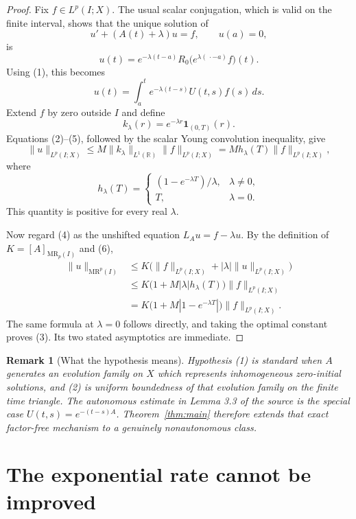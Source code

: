 \documentclass[11pt]{article}
\newtheorem{remark}[theorem]{Remark}
\newcommand{\R}{\mathbb R}
\newcommand{\Lp}{L^p}
\newcommand{\MR}{\mathrm{MR}^p}
\begin{document}
\begin{proof}
Fix $f\in\Lp(I;X)$.  The usual scalar conjugation, which is valid on the
finite interval, shows that the unique solution of
\[
 u'+(A(t)+\lambda)u=f,\qquad u(a)=0,
 \tag{4}
\]
is
\[
 u(t)=e^{-\lambda(t-a)}
 R_0\bigl(e^{\lambda(\,\cdot-a)}f\bigr)(t).
\]
Using (1), this becomes
\[
 u(t)=\int_a^t e^{-\lambda(t-s)}U(t,s)f(s)\,ds.
 \tag{5}
\]
Extend $f$ by zero outside $I$ and define
\[
 k_\lambda(r)=e^{-\lambda r}\mathbf 1_{(0,T)}(r).
\]
Equations (2)--(5), followed by the scalar Young convolution inequality,
give
\[
 \|u\|_{\Lp(I;X)}
 \le M\|k_\lambda\|_{L^1(\R)}\|f\|_{\Lp(I;X)}
 =M h_\lambda(T)\|f\|_{\Lp(I;X)},
 \tag{6}
\]
where
\[
 h_\lambda(T)=
 \begin{cases}
 (1-e^{-\lambda T})/\lambda,&\lambda\ne0,\\
 T,&\lambda=0.
 \end{cases}
\]
This quantity is positive for every real $\lambda$.

Now regard (4) as the unshifted equation
$L_Au=f-\lambda u$.  By the definition of
$K=[A]_{\mathrm{MR}_p(I)}$ and (6),
\begin{align*}
 \|u\|_{\MR(I)}
 &\le K\bigl(\|f\|_{\Lp(I;X)}
       +|\lambda|\|u\|_{\Lp(I;X)}\bigr)\\
 &\le K\bigl(1+M|\lambda|h_\lambda(T)\bigr)
       \|f\|_{\Lp(I;X)}\\
 &=K\bigl(1+M|1-e^{-\lambda T}|\bigr)
       \|f\|_{\Lp(I;X)}.
\end{align*}
The same formula at $\lambda=0$ follows directly, and taking the optimal
constant proves (3).  Its two stated asymptotics are immediate.
\end{proof}

\begin{remark}[What the hypothesis means]
Hypothesis (1) is standard when $A$ generates an evolution family on $X$
which represents inhomogeneous zero-initial solutions, and (2) is uniform
boundedness of that evolution family on the finite time triangle.  The
autonomous estimate in Lemma 3.3 of the source is the special case
$U(t,s)=e^{-(t-s)A}$.  Theorem~\ref{thm:main} therefore extends that exact
factor-free mechanism to a genuinely nonautonomous class.
\end{remark}

\section{The exponential rate cannot be improved}
\end{document}
